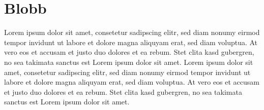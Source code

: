 \documentclass[twoside]{scrreprt}
\begin{document}
\section{Blobb}
Lorem ipsum dolor sit amet, consetetur sadipscing elitr, sed diam nonumy eirmod tempor invidunt ut labore et dolore magna aliquyam erat, sed diam voluptua. At vero eos et accusam et justo duo dolores et ea rebum. Stet clita kasd gubergren, no sea takimata sanctus est Lorem ipsum dolor sit amet. Lorem ipsum dolor sit amet, consetetur sadipscing elitr, sed diam nonumy eirmod tempor invidunt ut labore et dolore magna aliquyam erat, sed diam voluptua. At vero eos et accusam et justo duo dolores et ea rebum. Stet clita kasd gubergren, no sea takimata sanctus est Lorem ipsum dolor sit amet.





 
\end{document}
